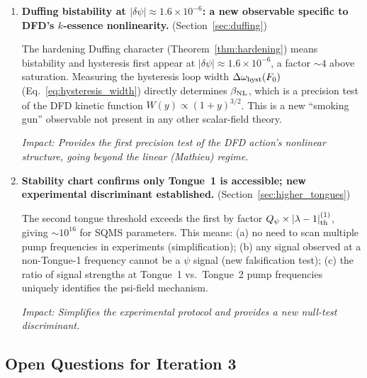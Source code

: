 \documentclass[11pt,twocolumn]{article}
\newcommand{\dpsi}{\delta\psi}
\newcommand{\lam}{\lambda}
\begin{document}
\begin{enumerate}
\emph{Impact: Establishes the maximum theoretical sensitivity
of a multi-sensor, multi-tone, squeezed DFD detection architecture.}

\item \textbf{Duffing bistability at $|\dpsi| \approx 1.6\times10^{-6}$:
a new observable specific to DFD's $k$-essence nonlinearity.}
(Section~\ref{sec:duffing})

The hardening Duffing character (Theorem~\ref{thm:hardening}) means
bistability and hysteresis first appear at $|\dpsi| \approx 1.6\times
10^{-6}$, a factor $\sim 4$ above saturation. Measuring the hysteresis
loop width $\Delta\omega_{\rm hyst}(F_0)$ (Eq.~\eqref{eq:hysteresis_width})
directly determines $\beta_{\rm NL}$, which is a precision test of
the DFD kinetic function $W(y) \propto (1+y)^{3/2}$. This is a new
``smoking gun'' observable not present in any other scalar-field theory.

\emph{Impact: Provides the first precision test of the DFD action's
nonlinear structure, going beyond the linear (Mathieu) regime.}

\item \textbf{Stability chart confirms only Tongue~1 is accessible;
new experimental discriminant established.}
(Section~\ref{sec:higher_tongues})

The second tongue threshold exceeds the first by factor $Q_\psi \times
|\lam-1|_{\rm th}^{(1)}$, giving $\sim 10^{16}$ for SQMS parameters.
This means: (a) no need to scan multiple pump frequencies in experiments
(simplification); (b) any signal observed at a non-Tongue-1 frequency
cannot be a $\psi$ signal (new falsification test); (c) the ratio of
signal strengths at Tongue~1 vs.\ Tongue~2 pump frequencies uniquely
identifies the psi-field mechanism.

\emph{Impact: Simplifies the experimental protocol and provides a
new null-test discriminant.}

\end{enumerate}

\subsection{Open Questions for Iteration 3}
\label{sec:open_questions}
\end{document}
